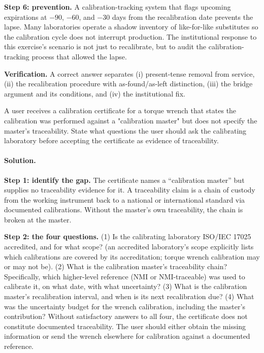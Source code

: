 \begin{exercise}
\textbf{Step 6: prevention.} A calibration-tracking system that
flags upcoming expirations at $-90$, $-60$, and $-30$ days from the
recalibration date prevents the lapse. Many laboratories operate a
shadow inventory of like-for-like substitutes so the calibration
cycle does not interrupt production. The institutional response to
this exercise's scenario is not just to recalibrate, but to audit
the calibration-tracking process that allowed the lapse.

\textbf{Verification.} A correct answer separates (i) present-tense
removal from service, (ii) the recalibration procedure with
as-found/as-left distinction, (iii) the bridge argument and its
conditions, and (iv) the institutional fix.
\end{exercise}

\begin{exercise}
A user receives a calibration certificate for a torque wrench that
states the calibration was performed against a "calibration
master" but does not specify the master's traceability. State what
questions the user should ask the calibrating laboratory before
accepting the certificate as evidence of traceability.

\paragraph{Solution.}
\textbf{Step 1: identify the gap.} The certificate names a
``calibration master'' but supplies no traceability evidence for
it. A traceability claim is a chain of custody from the working
instrument back to a national or international standard via
documented calibrations. Without the master's own traceability,
the chain is broken at the master.

\textbf{Step 2: the four questions.}
(1) Is the calibrating laboratory ISO/IEC 17025
accredited, and for what scope? (an accredited laboratory's scope
explicitly lists which calibrations are covered by its
accreditation; torque wrench calibration may or may not be).
(2) What is the calibration master's traceability chain? Specifically,
which higher-level reference (NMI or NMI-traceable) was used to
calibrate it, on what date, with what uncertainty? (3) What is the
calibration master's recalibration interval, and when is its next
recalibration due? (4) What was the uncertainty budget for the
wrench calibration, including the master's contribution? Without
satisfactory answers to all four, the certificate does not
constitute documented traceability. The user should either obtain
the missing information or send the wrench elsewhere for
calibration against a documented reference.
\end{exercise}

